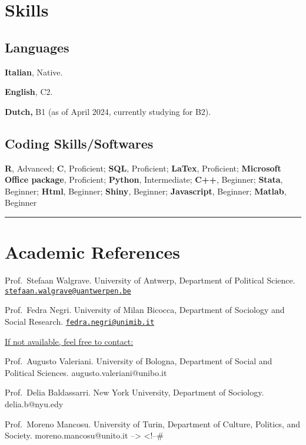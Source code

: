 \documentclass[10pt,]{article}
\providecommand{\tightlist}{%
  \setlength{\itemsep}{0pt}\setlength{\parskip}{0pt}}
\renewenvironment{itemize}{
  \begin{list}{}{
    \setlength{\leftmargin}{1.5em}
  }
}{
  \end{list}
}
\begin{document}
\section{Skills}\label{skills}

\subsection{Languages}\label{languages}

\begin{itemize}
\tightlist
\item
  \textbf{Italian}, Native.
\item
  \textbf{English}, C2.
\item
  \textbf{Dutch,} B1 (as of April 2024, currently studying for B2).
\end{itemize}

\subsection{Coding Skills/Softwares}\label{coding-skillssoftwares}

\begin{itemize}
\item
  \textbf{R}, Advanced; \textbf{C}, Proficient; \textbf{SQL},
  Proficient; \textbf{LaTex}, Proficient; \textbf{Microsoft Office
  package}, Proficient; \textbf{Python}, Intermediate; \textbf{C++},
  Beginner; \textbf{Stata}, Beginner; \textbf{Html}, Beginner;
  \textbf{Shiny}, Beginner; \textbf{Javascript}, Beginner;
  \textbf{Matlab}, Beginner

  \bigskip \hrule
\end{itemize}

\section{Academic References}\label{academic-references}

\begin{itemize}
\item
  Prof.~Stefaan Walgrave. University of Antwerp, Department of Political
  Science.
  \href{mailto:stefaan.walgrave@uantwerpen.be}{\nolinkurl{stefaan.walgrave@uantwerpen.be}}
\item
  Prof.~Fedra Negri. University of Milan Bicocca, Department of
  Sociology and Social Research.
  \href{mailto:fedra.negri@unimib.it}{\nolinkurl{fedra.negri@unimib.it}}

  \ul{If not available, feel free to contact:}
\item
  Prof.~Augusto Valeriani. University of Bologna, Department of Social
  and Political Sciences. augusto.valeriani@unibo.it
\item
  Prof.~Delia Baldassarri. New York University, Department of Sociology.
  delia.b@nyu.edy
\item
  Prof.~Moreno Mancosu. University of Turin, Department of Culture,
  Politics, and Society. moreno.mancosu@unito.it --\textgreater{}
  \textless!--\#
\end{itemize}
\end{document}
